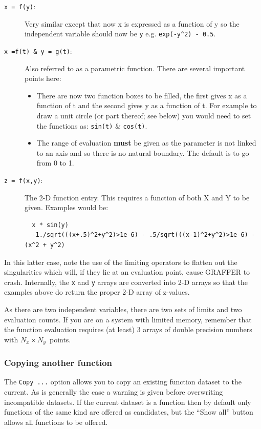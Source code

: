 \documentclass[11pt,twoside,english]{article}
\begin{document}
\begin{description}
\item [\texttt{x~=~f(y)}:]Very similar except that now x is expressed
  as a function of y so the independent variable should now be
  \texttt{y} e.g. \texttt{exp(-y\textasciicircum{}2) - 0.5}.
\item [\texttt{x~=f(t)~\&~y~=~g(t)}:]Also referred to as a parametric
  function. There are several important points here:

  \begin{itemize}
  \item There are now two function boxes to be filled, the first gives
    x as a function of t and the second gives y as a function of t. For
    example to draw a unit circle (or part thereof; see below) you
    would need to set the functions as: \texttt{sin(t)} \&
    \texttt{cos(t)}.
  \item The range of evaluation \textbf{must} be given as the parameter
    is not linked to an axis and so there is no natural boundary. The
    default is to go from 0 to 1.
  \end{itemize}
\item [\texttt{z~=~f(x,y)}:]The 2-D function entry. This requires a
  function of both X and Y to be given. Examples would be:

\begin{verbatim}
  x * sin(y)
  -1./sqrt(((x+.5)^2+y^2)>1e-6) - .5/sqrt(((x-1)^2+y^2)>1e-6) - (x^2 + y^2)
\end{verbatim}
\end{description}
In this latter case, note the use of the limiting operators to flatten
out the singularities which will, if they lie at an evaluation point,
cause GRAFFER to crash. Internally, the \texttt{x} and \texttt{y}
arrays are converted into 2-D arrays so that the examples above do
return the proper 2-D array of z-values.

As there are two independent variables, there are two sets of limits
and two evaluation counts. If you are on a system with limited memory,
remember that the function evaluation requires (at least) 3 arrays of
double precision numbers with $N_{x}\times N_{y}$\ points.

\subsubsection{Copying another function}
\label{sec:fcopy}

The \texttt{Copy ...} option allows you to copy an existing function
dataset to the current. As is generally the case a warning is given
before overwriting incompatible datasets. If the current dataset is a
function then by default only functions of the same kind are offered as
candidates, but the ``Show all'' button allows all functions to be
offered.
\end{document}
